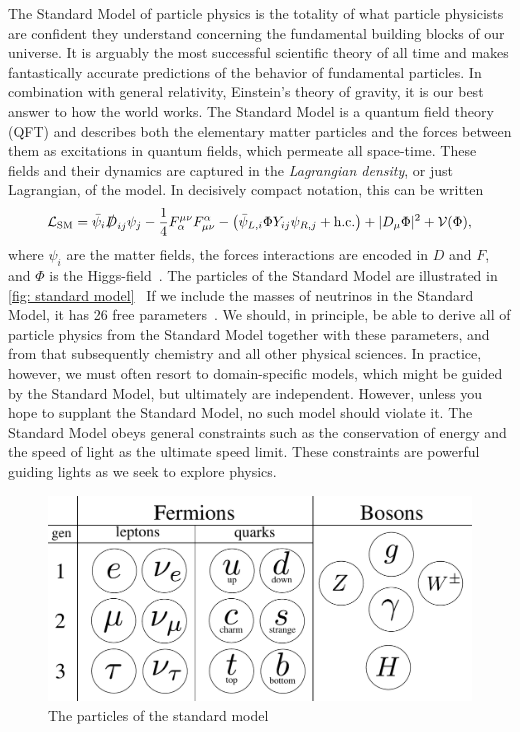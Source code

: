 The Standard Model of particle physics is the totality of what particle physicists are confident they understand concerning the fundamental building blocks of our universe.
It is arguably the most successful scientific theory of all time and makes fantastically accurate predictions of the behavior of fundamental particles.
In combination with general relativity, Einstein's theory of gravity, it is our best answer to how the world works.
The Standard Model is a quantum field theory (QFT) and describes both the elementary matter particles and the forces between them as excitations in quantum fields, which permeate all space-time.
These fields and their dynamics are captured in the \emph{Lagrangian density}, or just Lagrangian, of the model.
In decisively compact notation, this can be written
%
\begin{equation}
    \mathcal{L}_\text{SM}
    =
    \bar \psi_i \slashed{ D }_{ij}  \psi_j
    - \frac{1}{4} F_\alpha^{\mu\nu} F^\alpha_{\mu \nu}
    - \left( 
        \bar \psi_{L, i} \Phi Y_{ij} \psi_{R, j}
        + \text{h.c.}
    \right)
    + |D_{\mu} \Phi |^2 + \mathcal{V}(\Phi),
\end{equation}
%
where $\psi_i$ are the matter fields, the forces interactions are encoded in $D$ and $F$, and $\Phi$ is the Higgs-field~\autocite{carrollWorldEverydayExperience2013,schwartzQuantumFieldTheory2013}.
The particles of the Standard Model are illustrated in \autoref{fig: standard model}~\autocite{griffithsIntroductionElementaryParticles2008,schwartzQuantumFieldTheory2013}
If we include the masses of neutrinos in the Standard Model, it has 26 free parameters~\autocite{kramerStandardModelParticle2017}.
We should, in principle, be able to derive all of particle physics from the Standard Model together with these parameters, and from that subsequently chemistry and all other physical sciences.
In practice, however, we must often resort to domain-specific models, which might be guided by the Standard Model, but ultimately are independent.
However, unless you hope to supplant the Standard Model, no such model should violate it.
The Standard Model obeys general constraints such as the conservation of energy and the speed of light as the ultimate speed limit.
These constraints are powerful guiding lights as we seek to explore physics.



\begin{figure}[!htb]
    \centering
    \includegraphics[width=.75\textwidth]{figurer/standard_model.pdf}
    \caption{The particles of the standard model}
    \label{fig: standard model}
\end{figure}


